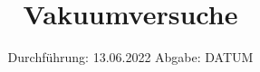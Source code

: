 

\subject{V70}
\title{Vakuumversuche}
\date{%
  Durchführung: 13.06.2022
  \hspace{3em}
  Abgabe: DATUM
}



\maketitle
\thispagestyle{empty}
\tableofcontents
\newpage

% 
% 




% 

\nocite{*}
\printbibliography{}



